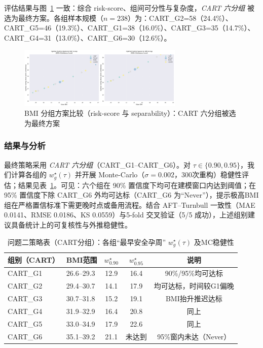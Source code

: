 \documentclass[withoutpreface]{cumcmthesis}
\begin{document}
评估结果与图~\ref{fig:p2_grouping} 一致：综合 risk-score、组间可分性与复杂度，\emph{CART 六分组} 被选为最终方案。各组样本规模（$n=238$）为：CART\_G2=\num{58}（24.4\%）、CART\_G5=\num{46}（19.3\%）、CART\_G1=\num{38}（16.0\%）、CART\_G3=\num{35}（14.7\%）、CART\_G4=\num{31}（13.0\%）、CART\_G6=\num{30}（12.6\%）。

\begin{figure}[htbp]
\centering
\includegraphics[width=0.7\textwidth]{output/figures/p2_bmi_groups_comparison.png}
\caption{BMI 分组方案比较（risk-score 与 separability）：CART 六分组被选为最终方案}
\label{fig:p2_grouping}
\end{figure}
\subsubsection{结果与分析}
最终策略采用 \emph{CART 六分组}（CART\_G1–CART\_G6）。对 $\tau\in\{0.90,0.95\}$，我们计算各组的 $w_g^{\star}(\tau)$ 并开展 Monte-Carlo（$\sigma=0.002$，300次重构）稳健性评估；结果见表~\ref{tab:p2_policy}。可见：六个组在 90\% 置信度下均可在建模窗口内达到阈值；在 95\% 置信度下除 CART\_G6 外均可达标（CART\_G6 为“Never”），提示极高BMI组在严格置信标准下需更晚时点或备用流程。结合 AFT–Turnbull 一致性（MAE 0.0141、RMSE 0.0186、KS 0.0559）与5-fold 交叉验证（5/5 成功），上述组别建议具备统计上的可复核性与外推稳健性。

\begin{table}[htbp]
\centering
\caption{问题二策略表（CART分组）：各组“最早安全孕周” $w_g^{\star}(\tau)$ 及MC稳健性}
\label{tab:p2_policy}
\begin{tabular}{@{}llccc@{}}
\toprule
组别（CART） & BMI范围 & $w_{0.90}^{\star}$ & $w_{0.95}^{\star}$ & 说明 \\
\midrule
CART\_G1 & 26.6--29.3 & 12.9 & 16.4 & 90\%/95\%均可达标 \\
CART\_G2 & 29.4--30.7 & 14.1 & 17.9 & 均可达标，时间较G1偏晚 \\
CART\_G3 & 30.7--31.8 & 15.2 & 19.1 & BMI抬升推迟达标 \\
CART\_G4 & 31.9--32.9 & 16.4 & 20.8 & 同上 \\
CART\_G5 & 33.0--34.9 & 17.9 & 22.6 & 同上 \\
CART\_G6 & 35.1--39.2 & 21.1 & 未达到 & 95\%窗内未达（Never） \\
\bottomrule
\end{tabular}
\end{table}
\end{document}
